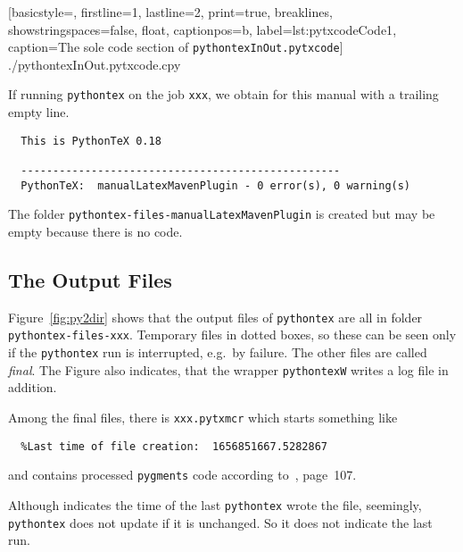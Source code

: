 \documentclass{article}
\newcommand{\pytex}{\texttt{pythontex}}
\begin{document}

%
[basicstyle=\scriptsize,
firstline=1, lastline=2, print=true,
breaklines, showstringspaces=false,
float,
captionpos=b, label={lst:pytxcodeCode1},
caption={The sole code section of \texttt{pythontexInOut.pytxcode}}]
{./pythontexInOut.pytxcode.cpy}


If running \texttt{pythontex} on the job \texttt{xxx}, 
we obtain for this manual with a trailing empty line. 
%
\begin{verbatim}
  This is PythonTeX 0.18

  --------------------------------------------------
  PythonTeX:  manualLatexMavenPlugin - 0 error(s), 0 warning(s)  
\end{verbatim}

The folder \texttt{pythontex-files-manualLatexMavenPlugin} is created 
but may be empty because there is no code. %



\subsection{The Output Files}\label{subsec:pytexOutFile}

  Figure~\ref{fig:py2dir} shows that the output files of \pytex{} 
  are all in folder \texttt{pythontex-files-xxx}. 
  Temporary files in dotted boxes, 
  so these can be seen only if the \pytex{} run is interrupted, e.g.~by failure. 
  The other files are called {\em final}. 
  The Figure also indicates, that the wrapper \texttt{pythontexW} writes a log file in addition. 
  
  Among the final files, there is \texttt{xxx.pytxmcr} 
  which starts something like 
%
\begin{lstlisting}
  %Last time of file creation:  1656851667.5282867
\end{lstlisting}
%
and contains processed \texttt{pygments} code according to~\cite{PythonTexP}, page~107. 

  Although indicates the time of the last \pytex{} wrote the file, 
  seemingly, \pytex{} does not update if it is unchanged. 
  So it does not indicate the last run. %
\end{document}
